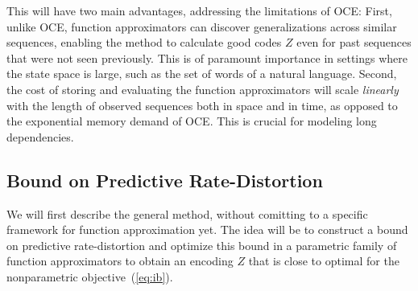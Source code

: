 \documentclass[11pt,letterpaper]{article}
\begin{document}
This will have two main advantages, addressing the limitations of OCE:
First, unlike OCE, function approximators can discover generalizations across similar sequences, enabling the method to calculate good codes $Z$ even for past sequences that were not seen previously.
This is of paramount importance in settings where the state space is large, such as the set of words of a natural language.
Second, the cost of storing and evaluating the function approximators will scale \emph{linearly} with the length of observed sequences both in space and in time, as opposed to the exponential memory demand of OCE.
This is crucial for modeling long dependencies.



\subsection{Bound on Predictive Rate-Distortion}
We will first describe the general method, without comitting to a specific framework for function approximation yet.
The idea will be to construct a bound on predictive rate-distortion and optimize this bound in a parametric family of function approximators to obtain an encoding $Z$ that is close to optimal for the nonparametric objective~(\ref{eq:ib}).
\end{document}
